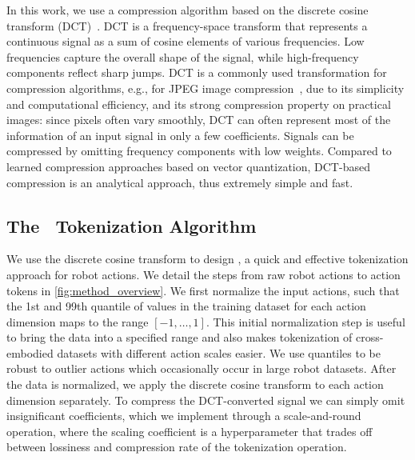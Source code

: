 In this work, we use a compression algorithm based on the discrete cosine transform (DCT)~\cite{dct}. DCT is a frequency-space transform that represents a continuous signal as a sum of cosine elements of various frequencies. Low frequencies capture the overall shape of the signal, while high-frequency components reflect sharp jumps. DCT is a commonly used transformation for compression algorithms, e.g., for JPEG image compression~\citep{jpeg}, due to its simplicity and computational efficiency, and its strong compression property on practical images: since pixels often vary smoothly, DCT can often represent most of the information of an input signal in only a few coefficients. Signals can be compressed by omitting frequency components with low weights. Compared to learned compression approaches based on vector quantization, DCT-based compression is an analytical approach, thus extremely simple and fast.


\subsection{The \ModelAcronym~Tokenization Algorithm}
\label{sec:dct_tokenizer}

We use the discrete cosine transform to design \ModelAcronym, a quick and effective tokenization approach for robot actions. We detail the steps from raw robot actions to action tokens in \cref{fig:method_overview}. We first normalize the input actions, such that the 1st and 99th quantile of values in the training dataset for each action dimension maps to the range $[-1, \dots, 1]$. This initial normalization step is useful to bring the data into a specified range and also makes tokenization of cross-embodied datasets with different action scales easier. We use quantiles to be robust to outlier actions which occasionally occur in large robot datasets. After the data is normalized, we apply the discrete cosine transform to each action dimension separately. To compress the DCT-converted signal we can simply omit insignificant coefficients, which we implement through a scale-and-round operation, where the scaling coefficient is a hyperparameter that trades off between lossiness and compression rate of the tokenization operation.

